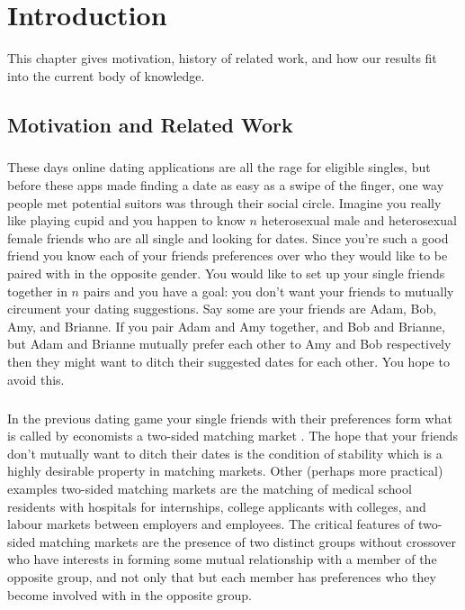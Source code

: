 \chapter{Introduction}
This chapter gives motivation, history of related work, and how our results fit into the current body of knowledge.

\section{Motivation and Related Work}

\paragraph{}
These days online dating applications are all the rage for eligible singles, but before these apps made finding a date as easy as a swipe of the finger, one way people met potential suitors was through their social circle. Imagine you really like playing cupid and you happen to know $n$ heterosexual male and heterosexual female friends who are all single and looking for dates. Since you're such a good friend you know each of your friends preferences over who they would like to be paired with in the opposite gender. You would like to set up your single friends together in $n$ pairs and you have a goal: you don't want your friends to mutually circument your dating suggestions. Say some are your friends are Adam, Bob, Amy, and Brianne. If you pair Adam and Amy together, and Bob and Brianne, but Adam and Brianne mutually prefer each other to Amy and Bob respectively then they might want to ditch their suggested dates for each other. You hope to avoid this.
\paragraph{}
In the previous dating game your single friends with their preferences form what is called by economists a two-sided matching market \cite{roth1992two}. The hope that your friends don't mutually want to ditch their dates is the condition of stability which is a highly desirable property in matching markets. Other (perhaps more practical) examples two-sided matching markets are the matching of medical school residents with hospitals for internships, college applicants with colleges, and labour markets between employers and employees. The critical features of two-sided matching markets are the presence of two distinct groups without crossover who have interests in forming some mutual relationship with a member of the opposite group, and not only that but each member has preferences who they become involved with in the opposite group.
